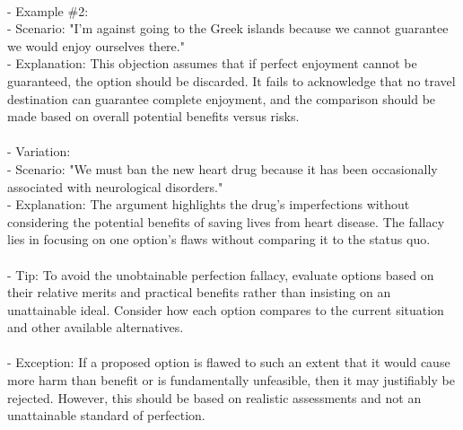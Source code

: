 \documentclass[a4paper,12pt,single,pdftex]{scrartcl}
\begin{document}
    
      
    \\

    
      - Example \#2:
    \\

    
        - Scenario: "I'm against going to the Greek islands because we cannot guarantee we would enjoy ourselves there."
    \\

    
        - Explanation: This objection assumes that if perfect enjoyment cannot be guaranteed, the option should be discarded. It fails to acknowledge that no travel destination can guarantee complete enjoyment, and the comparison should be made based on overall potential benefits versus risks.
    \\

    
      
    \\

    
      - Variation:
    \\

    
        - Scenario: "We must ban the new heart drug because it has been occasionally associated with neurological disorders."
    \\

    
        - Explanation: The argument highlights the drug's imperfections without considering the potential benefits of saving lives from heart disease. The fallacy lies in focusing on one option's flaws without comparing it to the status quo.
    \\

    
      
    \\

    
      - Tip: To avoid the unobtainable perfection fallacy, evaluate options based on their relative merits and practical benefits rather than insisting on an unattainable ideal. Consider how each option compares to the current situation and other available alternatives.
    \\

    
      
    \\

    
      - Exception: If a proposed option is flawed to such an extent that it would cause more harm than benefit or is fundamentally unfeasible, then it may justifiably be rejected. However, this should be based on realistic assessments and not an unattainable standard of perfection.
    \\
\end{document}
